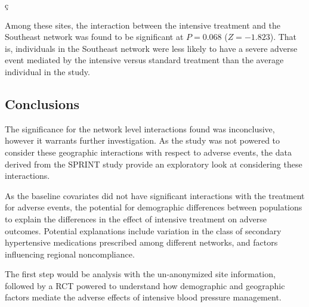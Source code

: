 ç\documentclass[10pt]{article}
\begin{document}
Among these sites, the interaction between the intensive treatment and the
Southeast network was found to be significant at $P = 0.068$ ($Z =
-1.823$). That is, individuals in the Southeast network were less
likely to have a severe adverse event mediated by the intensive versus
standard treatment than the average individual in the study.

\subsection{Conclusions}
The significance for the network level interactions found was inconclusive,
however it warrants further investigation. As the study was not powered to
consider these geographic interactions with respect to adverse events, the data
derived from the SPRINT study provide an exploratory look at considering these
interactions.

As the baseline covariates did not have significant interactions with
the treatment for adverse events, the potential for demographic
differences between populations to explain the differences in the
effect of intensive treatment on adverse outcomes. Potential
explanations include variation in the class of secondary hypertensive
medications prescribed among different networks, and factors
influencing regional noncompliance.

The first step would be analysis with the un-anonymized site
information, followed by a RCT powered to understand how demographic and
geographic factors mediate the adverse effects of intensive blood pressure
management.
\end{document}
